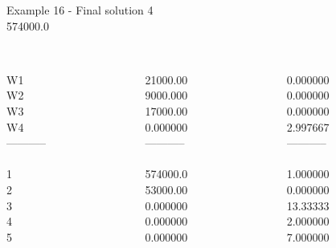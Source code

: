\begin{frame}{Example 16 - Final solution}
\footnotesize
{}  4\\
  574000.0\\

\begin{columns}[t]
\begin{column}{0.3\textwidth}

\\
W1\\
W2\\
W3\\
W4\\
-----------\\
\\
1\\
2\\
3\\
4\\
5\\

\end{column}
\begin{column}{0.3\textwidth}

\\
21000.00\\
9000.000\\
17000.00\\
0.000000\\


-----------\\
\\
574000.0\\
53000.00\\
0.000000\\
0.000000\\
0.000000\\

\end{column}

\begin{column}{0.3\textwidth}

\\
0.000000\\
0.000000\\
0.000000\\
2.997667\\

-----------\\
\\
1.000000\\
0.000000\\
13.33333\\
2.000000\\
7.000000\\
\end{column}
\end{columns}
\end{frame}
